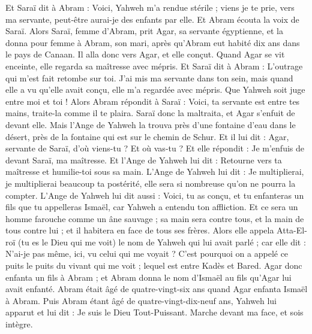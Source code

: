 \begin{multicols}{2}
Et Saraï dit à Abram : Voici, Yahweh m'a rendue stérile ; viens je te prie, vers ma servante, peut-être aurai-je des enfants par elle. Et Abram écouta la voix de Saraï.
Alors Saraï, femme d'Abram, prit Agar, sa servante égyptienne, et la donna pour femme à Abram, son mari, après qu'Abram eut habité dix ans dans le pays de Canaan.
Il alla donc vers Agar, et elle conçut. Quand Agar se vit enceinte, elle regarda sa maîtresse avec mépris.
Et Saraï dit à Abram : L'outrage qui m'est fait retombe sur toi. J'ai mis ma servante dans ton sein, mais quand elle a vu qu'elle avait conçu, elle m'a regardée avec mépris. Que Yahweh soit juge entre moi et toi !
Alors Abram répondit à Saraï : Voici, ta servante est entre tes mains, traite-la comme il te plaira. Saraï donc la maltraita, et Agar s'enfuit de devant elle.
Mais l'Ange de Yahweh la trouva près d'une fontaine d'eau dans le désert, près de la fontaine qui est sur le chemin de Schur.
Et il lui dit : Agar, servante de Saraï, d'où viens-tu ? Et où vas-tu ? Et elle répondit : Je m'enfuis de devant Saraï, ma maîtresse.
Et l'Ange de Yahweh lui dit : Retourne vers ta maîtresse et humilie-toi sous sa main.
L'Ange de Yahweh lui dit : Je multiplierai, je multiplierai beaucoup ta postérité, elle sera si nombreuse qu'on ne pourra la compter.
L'Ange de Yahweh lui dit aussi : Voici, tu as conçu, et tu enfanteras un fils que tu appelleras Ismaël, car Yahweh a entendu ton affliction.
Et ce sera un homme farouche comme un âne sauvage ; sa main sera contre tous, et la main de tous contre lui ; et il habitera en face de tous ses frères.
Alors elle appela Atta-El-roï (tu es le Dieu qui me voit) le nom de Yahweh qui lui avait parlé ; car elle dit : N'ai-je pas même, ici, vu celui qui me voyait ?
C'est pourquoi on a appelé ce puits le puits du vivant qui me voit ; lequel est entre Kadès et Bared.
Agar donc enfanta un fils à Abram ; et Abram donna le nom d'Ismaël au fils qu'Agar lui avait enfanté.
Abram était âgé de quatre-vingt-six ans quand Agar enfanta Ismaël à Abram.
\VerseOne{}Puis Abram étant âgé de quatre-vingt-dix-neuf ans, Yahweh lui apparut et lui dit : Je suis le Dieu Tout-Puissant. Marche devant ma face, et sois intègre.

\end{multicols}
